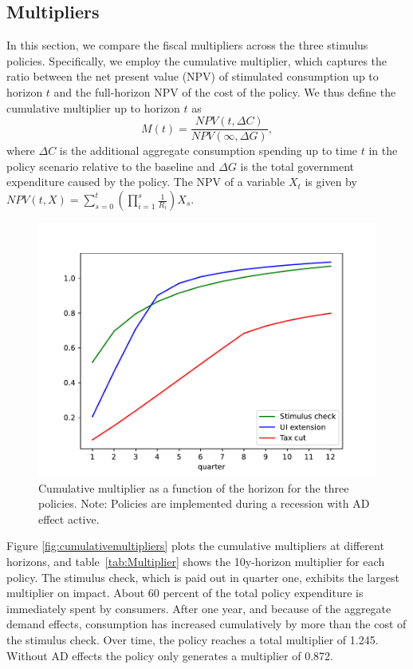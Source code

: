 \documentclass[\econtexRoot/HAFiscal]{subfiles}
\begin{document}
\hypertarget{multipliers}{}\par\subsection{Multipliers}
\notinsubfile{\label{sec:multipliers}}

In this section, we compare the fiscal multipliers across the three stimulus policies. Specifically, we employ the cumulative multiplier, which captures the ratio between the net present value (NPV) of stimulated consumption up to horizon $t$ and the full-horizon NPV of the cost of the policy. We thus define the cumulative multiplier up to horizon $t$ as
\begin{equation*}
  M(t) = \frac{NPV(t,\Delta C)}{NPV (\infty,\Delta G)},
\end{equation*}
where $\Delta C$ is the additional aggregate consumption spending up to time $t$ in the policy scenario relative to the baseline and $\Delta G$ is the total government expenditure caused by the policy. The NPV of a variable $X_t$ is given by 
$NPV(t,X) = \sum_{s=0}^{t} \left( \prod_{i=1}^{s} \frac{1}{R_i} \right) X_s$. 

\begin{figure}[t]
  \centering
  \includegraphics[width=0.8\linewidth]{Code/HA-Models/FromPandemicCode/Figures/Cummulative_multipliers}
  \caption{Cumulative multiplier as a function of the horizon for the three policies. Note: Policies are implemented during a recession with AD effect active.}
  \notinsubfile{\label{fig:cumulativemultipliers}}
\end{figure}

Figure \ref{fig:cumulativemultipliers} plots the cumulative multipliers at different horizons, and table~\ref{tab:Multiplier} shows the 10y-horizon multiplier for each policy. The stimulus check, which is paid out in quarter one, exhibits the largest multiplier on impact. About 60 percent of the total policy expenditure is immediately spent by consumers. After one year, and because of the aggregate demand effects, consumption has increased cumulatively by more than the cost of the stimulus check. Over time, the policy reaches a total multiplier of 1.245. Without AD effects the policy only generates a multiplier of 0.872.
\end{document}
